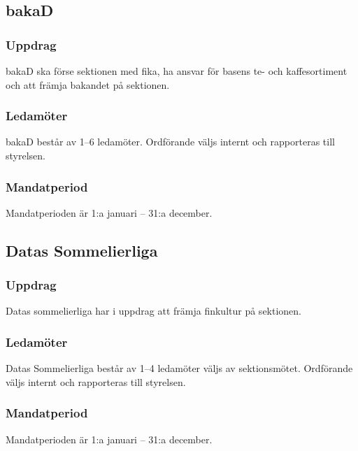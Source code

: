 \subsection{bakaD}
\subsubsection{Uppdrag}
bakaD ska förse sektionen med fika, ha ansvar för basens te- och kaffesortiment och att främja bakandet på sektionen.
\subsubsection{Ledamöter}
bakaD består av 1--6 ledamöter. Ordförande väljs internt och rapporteras till styrelsen.
\subsubsection{Mandatperiod}
Mandatperioden är 1:a januari – 31:a december.

\subsection{Datas Sommelierliga}
\subsubsection{Uppdrag}
Datas sommelierliga har i uppdrag att främja finkultur på sektionen.
\subsubsection{Ledamöter}
Datas Sommelierliga består av 1--4 ledamöter väljs av sektionsmötet. Ordförande väljs internt och rapporteras till styrelsen.
\subsubsection{Mandatperiod}
Mandatperioden är 1:a januari – 31:a december.
\newpage
